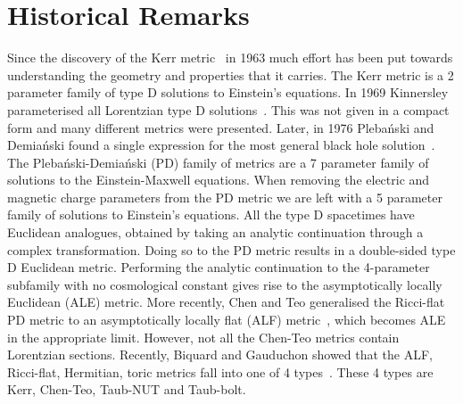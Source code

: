 \documentclass[10pt]{report}
\newcommand{\pleb}[0]{Pleba\'nski}
\newcommand{\demi}[0]{Demia\'nski}
\theoremstyle{definition}
\begin{document}
\section{Historical Remarks}\label{sec:type-D-historical-remarks}
    Since the discovery of the Kerr metric~\cite{GravitationalFKerr1963} in 1963 much effort has been put towards understanding the geometry and properties that it carries. The Kerr metric is a 2 parameter family of type D solutions to Einstein's equations. In 1969 Kinnersley parameterised all Lorentzian type D solutions~\cite{TypeDVacuumMKinner1969}. This was not given in a compact form and many different metrics were presented. Later, in 1976 \pleb{} and \demi{} found a single expression for the most general black hole solution~\cite{RotatingChargPleban1976,ANewLookAtTGriffi2005}. The \pleb{}-\demi{} (PD) family of metrics are a 7 parameter family of solutions to the Einstein-Maxwell equations. When removing the electric and magnetic charge parameters from the PD metric we are left with a 5 parameter family of solutions to Einstein's equations. All the type D spacetimes have Euclidean analogues, obtained by taking an analytic continuation through a complex transformation. Doing so to the PD metric results in a double-sided type D Euclidean metric. Performing the analytic continuation to the 4-parameter subfamily with no cosmological constant gives rise to the asymptotically locally Euclidean (ALE) metric. More recently, Chen and Teo generalised the Ricci-flat PD metric to an asymptotically locally flat (ALF) metric~\cite{AFiveParameteChen2015}, which becomes ALE in the appropriate limit. However, not all the Chen-Teo metrics contain Lorentzian sections. Recently, Biquard and Gauduchon showed that the ALF, Ricci-flat, Hermitian, toric metrics fall into one of 4 types~\cite{OnToricHermitBiquar2021}. These 4 types are Kerr, Chen-Teo, Taub-NUT and Taub-bolt.
    
\end{document}
